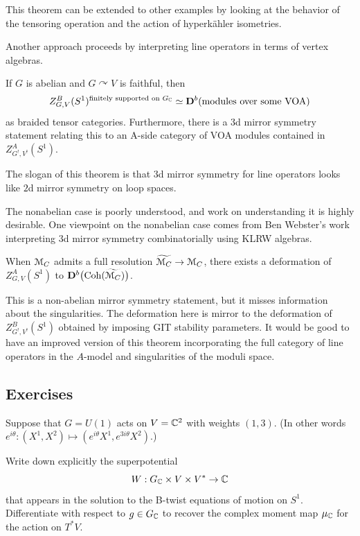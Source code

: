 This theorem can be extended to other examples by looking at the behavior of the tensoring operation and the action of hyperk\"ahler isometries.

Another approach proceeds by interpreting line operators in terms of vertex algebras.

\begin{Theorem}
If $G$ is abelian and $G \curvearrowright V$ is faithful, then
\[
Z^B_{G,V}(S^1)^{\mathrm{finitely \,\, supported \,\, on \,\,} G_{\mathbb{C}}} \simeq {\mathbf{D}}^b(\mathrm{modules \,\, over \,\, some \,\, VOA})
\]
as braided tensor categories.
Furthermore, there is a $3$d mirror symmetry statement relating this to an A-side category of VOA modules contained in $Z^A_{G^!,V^!}(S^1)$.
\end{Theorem}

The slogan of this theorem is that $3$d mirror symmetry for line operators looks like $2$d mirror symmetry on loop spaces.

The nonabelian case is poorly understood, and work on understanding it is highly desirable.
One viewpoint on the nonabelian case comes from Ben Webster's work interpreting $3$d mirror symmetry combinatorially using KLRW algebras.

\begin{Theorem}[Webster]
When $\mathcal{M}_C$ admits a full resolution $\widetilde{\mathcal{M}_C} \to \mathcal{M}_C$, there exists a deformation of $Z^A_{G,V}(S^1)$ to ${\mathbf{D}}^b\big(\mathrm{Coh}(\widetilde{\mathcal{M}_C})\big)$.
\end{Theorem}

This is a non-abelian mirror symmetry statement, but it misses information about the singularities.
The deformation here is mirror to the deformation of $Z^B_{G^!, V^!}(S^1)$ obtained by imposing GIT stability parameters.
It would be good to have an improved version of this theorem incorporating the full category of line operators in the $A$-model and singularities of the moduli space.

\subsection{Exercises}

\begin{exercise}
Suppose that $G=U(1)$ acts on $V=\mathbb{C}^2$ with weights $(1,3)$. (In other words $e^{i\theta}:(X^1,X^2)\mapsto (e^{i\theta}X^1,e^{3i\theta}X^2)$.)

Write down explicitly the superpotential
%
$$  W : G_{\mathbb{C}} \times V \times V^* \to \mathbb{C} $$
%
that appears in the solution to the B-twist equations of motion on $S^1$. Differentiate with respect to $g\in G_{\mathbb{C}}$ to recover the complex moment map $\mu_{\mathbb{C}}$ for the action on $T^*V$.

\end{exercise}

